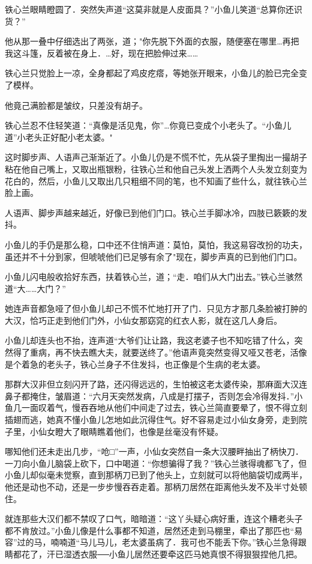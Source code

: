 \documentclass[12pt,oneside]{book}
\begin{document}
铁心兰眼睛瞪圆了．突然失声道``这莫非就是人皮面具？''小鱼儿笑道``总算你还识货？''

他从那一叠中仔细选出了两张，道；"你先脱下外面的衣服，随便塞在哪里\ldots 再把我这斗篷，反着被在身上．\ldots 好，现在把脸伸过来\ldots\ldots{}

铁心兰只觉脸上一凉，全身都起了鸡皮疙瘩，等她张开眼来，小鱼儿的脸已完全变了模样。

他竟己满脸都是皱纹，只差没有胡子。

铁心兰忍不住轻笑道：``真像是活见鬼，你''\ldots 你竟已变成个小老头了。``小鱼儿道''小老头正好配小老太婆。"

这时脚步声、人语声己渐渐近了。小鱼儿仍是不慌不忙，先从袋子里掏出一撮胡子粘在他自己嘴上，又取出瓶银粉，往铁心兰和他自己头发上洒两个人头发立刻变为花白的，然后，小鱼儿又取出几只粗细不同的笔，也不知画了些什么，就往铁心兰脸上画。

人语声、脚步声越来越近，好像已到他们门口。铁心兰手脚冰冷，四肢已簌簌的发抖。

小鱼儿的手仍是那么稳，口中还不住悄声道：莫怕，莫怕，我这易容改扮的功夫，虽还并不十分到家，但唬唬他们已足够有余了"现在，脚步声真的已到他们门口。

小鱼儿闪电般收拾好东西，扶着铁心兰，道；``走．咱们从大门出去。''铁心兰骇然道``大\ldots\ldots 大门？''

她连声音都急哑了但小鱼儿却己不慌不忙地打开了门．只见方才那几条脸被打肿的大汉，恰巧正走到他们门外，小仙女那窈窕的红衣人影，就在这几人身后。

小鱼儿却连头也不抬，连声道``大爷们让让路，我这老婆子也不知吃错了什么，突然得了重病，再不快去瞧大夫，就要送终了。''他语声竟突然变得又哑又苍老，活像是个着急的老头子，铁心兰身子不住发抖，也正像是个生病的老太婆。

那群大汉非但立刻闪开了路，还闪得远远的，生怕被这老太婆传染，那麻面大汉连鼻子都掩住，皱眉道：``六月天突然发病，八成是打摆子，否则怎会冷得发抖．''小鱼几一面叹着气，慢吞吞地从他们中间走了过去，铁心兰简直要晕了，恨不得立刻插翅而逃，她真不懂小鱼儿怎地如此沉得住气。好不容易走过小仙女身旁，走到院子里，小仙女瞪大了眼睛瞧着他们，也像是丝毫没有怀疑。

哪知他们还未走出几步，``呛□''一声，小仙女突然自一条大汉腰畔抽出了柄快刀．一刀向小鱼儿脑袋上砍下，口中喝道：``你想骗得了我？''铁心兰骇得魂都飞了，但小鱼儿却似毫未觉察，直到那柄刀已到了他头上，立刻就可以将他脑袋切成两半，他还是动也不动，还是一步步慢吞吞走着。那柄刀居然在距离他头发不及半寸处顿住。

就连那些大汉们都不禁叹了口气，暗暗道：``这丫头疑心病好重，连这个糟老头子都不肯放过。''小鱼儿像是什么事都不知道，居然还走到马棚里，牵出了那匹也``易容''过的马，喃喃道``马儿马儿，老太婆虽病了．我可也不能丢下你。''铁心兰急得跟睛都花了，汗已湿透衣服──小鱼儿居然还要牵这匹马她真恨不得狠狠捏他几把。
\end{document}
